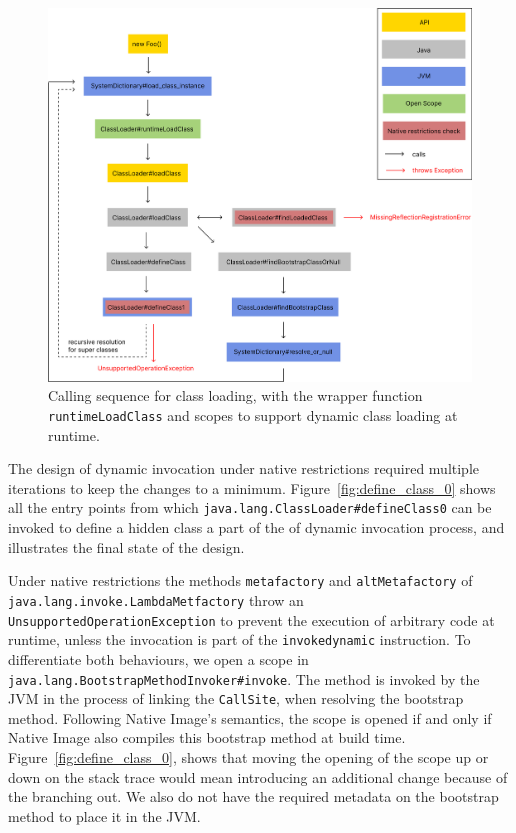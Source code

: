 
\begin{figure}
    \centering
    \includegraphics[scale=0.5]{resources/Group 412.png}
    \caption{Calling sequence for class loading, with the wrapper function \texttt{runtimeLoadClass} and scopes to support dynamic class loading at runtime.}
    \label{fig:load_class}
\end{figure}

The design of dynamic invocation under native restrictions required multiple iterations to keep the changes to a minimum. Figure~\ref{fig:define_class_0} shows all the entry points from which \verb|java.lang.ClassLoader#defineClass0| can be invoked to define a hidden class a part of the of dynamic invocation process, and illustrates the final state of the design. 

Under native restrictions the methods \verb|metafactory| and \verb|altMetafactory| of \verb|java.lang.invoke.LambdaMetfactory| throw an \verb|UnsupportedOperationException| to prevent the execution of arbitrary code at runtime, unless the invocation is part of the \verb|invokedynamic| instruction.
To differentiate both behaviours, we open a scope in \verb|java.lang.BootstrapMethodInvoker#invoke|. The method is invoked by the JVM in the process of linking the \verb|CallSite|, when resolving the bootstrap method. Following Native Image's semantics, the scope is opened if and only if Native Image also compiles this bootstrap method at build time. Figure~\ref{fig:define_class_0}, shows that moving the opening of the scope up or down on the stack trace would mean introducing an additional change because of the branching out. We also do not have the required metadata on the bootstrap method to place it in the JVM.

